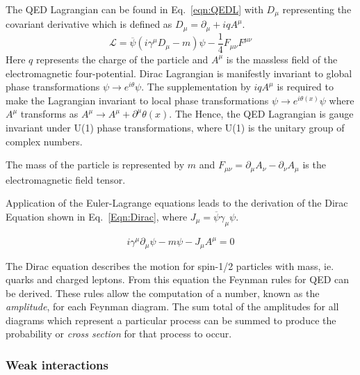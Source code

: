 The QED Lagrangian can be found in Eq.~\ref{eqn:QEDL} with $D_{\mu}$ representing the covariant derivative which is defined as $D_{\mu} = \partial_{\mu} + iqA^{\mu}$. 
\begin{equation}
\mathcal{L} = \overline{\psi}\left(i\gamma^{\mu}D_{\mu}-m\right)\psi - \frac{1}{4}F_{\mu\nu}F^{\mu\nu}
\label{eqn:QEDL}
\end{equation}
Here $q$ represents the charge of the particle and $A^{\mu}$ is the massless field of the electromagnetic four-potential. Dirac Lagrangian is manifestly invariant to global phase transformations $\psi \rightarrow e^{i\theta} \psi$. The supplementation by $iqA^{\mu}$ is required to make the Lagrangian invariant to local phase transformations $\psi \rightarrow e^{i\theta(x)} \psi$ where $A^{\mu}$ transforms as $A^{\mu} \rightarrow A^{\mu} + \partial^{\mu}\theta(x)$. The  Hence, the QED Lagrangian is gauge invariant under U(1) phase transformations, where U(1) is the unitary group of complex numbers. 

The mass of the particle is represented by $m$ and $F_{\mu\nu} = \partial_{\mu}A_{\nu} - \partial_{\nu}A_{\mu}$ is the electromagnetic field tensor.

Application of the Euler-Lagrange equations leads to the derivation of the Dirac Equation shown in Eq.~\ref{Eqn:Dirac}, where $J_{\mu} = \overline{\psi}\gamma_{\mu}\psi$.

\begin{equation}
i\gamma ^{\mu }\partial _{\mu }\psi -m\psi - J_{\mu}A^{\mu} = 0
\label{Eqn:Dirac}
\end{equation}

The Dirac equation describes the motion for spin-1/2 particles with mass, ie. quarks and charged leptons. From this equation the Feynman rules for QED can be derived. These rules allow the computation of a number, known as the \emph{amplitude}, for each Feynman diagram. The sum total of the amplitudes for all diagrams which represent a particular process can be summed to produce the probability or \emph{cross section} for that process to occur.



\subsubsection{Weak interactions}

